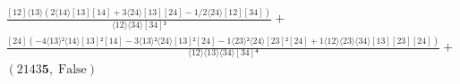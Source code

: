 \documentclass[varwidth, border=5pt]{standalone}
\begin{document}
\begin{my}
$\begin{gathered}
\scriptscriptstyle\frac{[12]⟨13⟩(2⟨14⟩[13][14]+3⟨24⟩[13][24]-1/2⟨24⟩[12][34])}{⟨12⟩⟨34⟩[34]³} +\\
\scriptscriptstyle\frac{[24](-4⟨13⟩²⟨14⟩[13]²[14]-3⟨13⟩²⟨24⟩[13]²[24]-1⟨23⟩²⟨24⟩[23]²[24]+1⟨12⟩⟨23⟩⟨34⟩[13][23][24])}{⟨12⟩⟨13⟩⟨34⟩[34]⁴} +\\
\scriptscriptstyle(2143𝟓,\;\text{False}) \phantom{+}
\end{gathered}$
\end{my}
\end{document}
